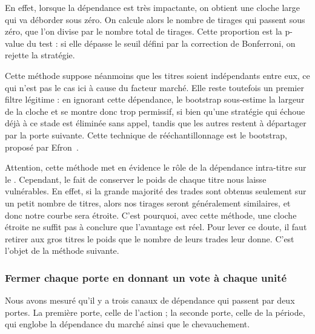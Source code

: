 En effet, lorsque la dépendance est très impactante, on obtient une cloche
large qui va déborder sous zéro. On calcule alors le nombre de tirages qui
passent sous zéro, que l'on divise par le nombre total de tirages. Cette
proportion est la p-value du test : si elle dépasse le seuil défini par la
correction de Bonferroni, on rejette la stratégie.

Cette méthode suppose néanmoins que les titres soient indépendants entre
eux, ce qui n'est pas le cas ici à cause du facteur marché. Elle reste
toutefois un premier filtre légitime : en ignorant cette dépendance, le
bootstrap sous-estime la largeur de la cloche et se montre donc trop
permissif, si bien qu'une stratégie qui échoue déjà à ce stade est éliminée
sans appel, tandis que les autres restent à départager par la porte suivante.
Cette technique de rééchantillonnage est le bootstrap, proposé par
Efron~\cite{efron1979}.

Attention, cette méthode met en évidence le rôle de la dépendance intra-titre
sur le \edgevar{}. Cependant, le fait de conserver le poids de chaque titre nous laisse
vulnérables. En effet, si la grande majorité des trades sont obtenus seulement sur
un petit nombre de titres, alors nos tirages seront généralement similaires,
et donc notre courbe sera étroite.
C'est pourquoi, avec cette méthode, une cloche étroite ne suffit pas à
conclure que l'avantage est réel.
Pour lever ce doute, il faut retirer aux gros titres le poids que le nombre
de leurs trades leur donne. C'est l'objet de la méthode suivante.

\subsubsection*{Fermer chaque porte en donnant un vote à chaque unité}

Nous avons mesuré qu'il y a trois canaux de dépendance qui passent par deux portes.
La première porte, celle de l'action ; la seconde porte, celle de la période, qui
englobe la dépendance du marché ainsi que le chevauchement.

